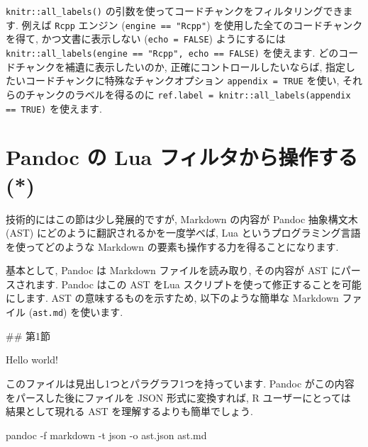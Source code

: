 \documentclass[
  11pt,
  lualatex,ja=standard,jafont=noto]{bxjsreport}
\newenvironment{Shaded}{\begin{snugshade}}{\end{snugshade}}
\newcommand{\AttributeTok}[1]{\textcolor[rgb]{0.77,0.63,0.00}{#1}}
\newcommand{\ExtensionTok}[1]{#1}
\newcommand{\FunctionTok}[1]{\textcolor[rgb]{0.00,0.00,0.00}{#1}}
\newcommand{\NormalTok}[1]{#1}
\begin{document}
\texttt{knitr::all\_labels()} の引数を使ってコードチャンクをフィルタリングできます. 例えば \texttt{Rcpp} エンジン (\texttt{engine == "Rcpp"}) を使用した全てのコードチャンクを得て, かつ文書に表示しない (\texttt{echo = FALSE}) ようにするには \texttt{knitr::all\_labels(engine == "Rcpp", echo == FALSE)} を使えます. どのコードチャンクを補遺に表示したいのか, 正確にコントロールしたいならば, 指定したいコードチャンクに特殊なチャンクオプション \texttt{appendix = TRUE} を使い, それらのチャンクのラベルを得るのに \texttt{ref.label = knitr::all\_labels(appendix == TRUE)} を使えます.

\hypertarget{lua-filters}{%
\section{Pandoc の Lua フィルタから操作する (*)}\label{lua-filters}}


技術的にはこの節は少し発展的ですが, Markdown の内容が Pandoc 抽象構文木 (AST) にどのように翻訳されるかを一度学べば, Lua というプログラミング言語を使ってどのような Markdown の要素も操作する力を得ることになります.

基本として, Pandoc は Markdown ファイルを読み取り, その内容が AST にパースされます. Pandoc はこの AST をLua スクリプトを使って修正することを可能にします. AST の意味するものを示すため, 以下のような簡単な Markdown ファイル (\texttt{ast.md}) を使います.

\begin{Shaded}
\begin{Highlighting}[numbers=left,,]
\FunctionTok{\#\# 第1節}

\NormalTok{Hello world!}
\end{Highlighting}
\end{Shaded}

このファイルは見出し1つとパラグラフ1つを持っています. Pandoc がこの内容をパースした後にファイルを JSON 形式に変換すれば, R ユーザーにとっては 結果として現れる AST を理解するよりも簡単でしょう.

\begin{Shaded}
\begin{Highlighting}[numbers=left,,]
\ExtensionTok{pandoc} \AttributeTok{{-}f}\NormalTok{ markdown }\AttributeTok{{-}t}\NormalTok{ json }\AttributeTok{{-}o}\NormalTok{ ast.json ast.md}
\end{Highlighting}
\end{Shaded}
\end{document}
